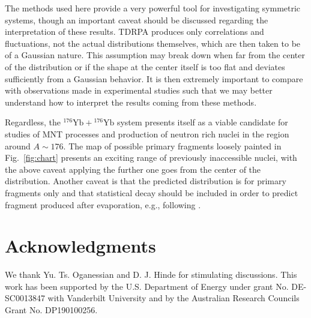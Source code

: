 The methods used here provide a very powerful tool for investigating symmetric systems, though an important caveat should be discussed regarding the interpretation of these results.
TDRPA produces only correlations and fluctuations, not the actual distributions themselves, which are then taken to be of a Gaussian nature.
This assumption may break down when far from the center of the distribution or if the shape at the center itself is too flat and deviates sufficiently from a Gaussian behavior.
It is then extremely important to compare with observations made in experimental studies such that we may better understand how to interpret the results coming from these methods.

Regardless, the $^{176}\mathrm{Yb}+{}^{176}\mathrm{Yb}$ system presents itself as a viable candidate for studies of MNT processes and production of neutron rich nuclei in the region around $A\sim176$.
The map of possible primary fragments loosely painted in Fig.~\ref{fig:chart} presents an exciting range of previously inaccessible nuclei, with the above caveat applying the further one goes from the center of the distribution.
Another caveat is that the predicted distribution is for primary fragments only and that statistical decay should be included in order to predict fragment produced after evaporation, e.g., following \citep{sekizawa2017,umar2017,wu2019}.


\section{Acknowledgments}
	We thank Yu. Ts. Oganessian and D. J. Hinde for stimulating discussions.
	This work has been supported by the U.S. Department of Energy under grant No.
	DE-SC0013847 with Vanderbilt University and by the
	Australian Research Councils Grant No. DP190100256.



\clearpage

